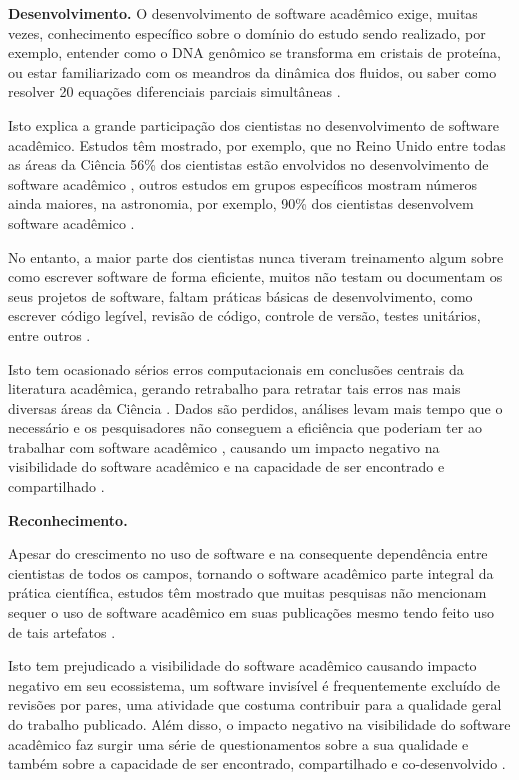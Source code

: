 \begin{description}
\item \textbf{Desenvolvimento.}
O desenvolvimento de software acadêmico exige, muitas vezes, conhecimento
específico sobre o domínio do estudo sendo realizado,
por exemplo, entender como o DNA genômico
se transforma em cristais de proteína, ou estar familiarizado com os meandros
da dinâmica dos fluidos, ou saber como resolver 20 equações diferenciais
parciais simultâneas \cite{segal2008developing}.

Isto explica a grande participação dos cientistas no desenvolvimento de
software acadêmico. Estudos têm mostrado, por exemplo, que no Reino Unido entre todas as
áreas da Ciência 56\% dos cientistas estão envolvidos no desenvolvimento de
software acadêmico \cite{hettrick2014uk}, outros estudos em grupos específicos mostram números ainda
maiores, na astronomia, por exemplo, 90\% dos cientistas desenvolvem software
acadêmico \cite{momcheva2015software}.

No entanto, a maior parte dos cientistas nunca tiveram treinamento algum sobre como escrever
software de forma eficiente, muitos não testam ou documentam os seus projetos de
software, faltam práticas básicas de desenvolvimento, como escrever código
legível, revisão de código, controle de versão, testes unitários, entre outros
\cite{wilson2017good}.

Isto tem ocasionado sérios erros computacionais em conclusões centrais da
literatura acadêmica, gerando retrabalho para retratar tais erros nas mais
diversas áreas da Ciência \cite{merali2010computational}.
Dados são perdidos, análises levam mais tempo que o necessário e os
pesquisadores não conseguem a eficiência que poderiam ter ao trabalhar com
software acadêmico \cite{wilson2017good},
causando um impacto negativo na visibilidade do software acadêmico e na
capacidade de ser encontrado e compartilhado \cite{howison2013incentives,
katz2014transitive}.

\item \textbf{Reconhecimento.}

Apesar do crescimento no uso de software e na consequente dependência entre
cientistas de todos os campos, tornando o software acadêmico parte integral da
prática científica, estudos têm
mostrado que muitas pesquisas não mencionam sequer o uso de software acadêmico
em suas publicações mesmo tendo feito uso de tais artefatos
\cite{momcheva2015software, howison2016software}.

Isto tem prejudicado a visibilidade do software acadêmico causando impacto
negativo em seu ecossistema, um software invisível é frequentemente excluído de
revisões por pares, uma atividade que costuma contribuir para a qualidade geral
do trabalho publicado. Além disso, o
impacto negativo na visibilidade do software acadêmico faz surgir uma
série de questionamentos sobre a sua qualidade e também sobre a
capacidade de ser encontrado, compartilhado e co-desenvolvido
\cite{howison2013incentives, katz2014transitive, howison2016software}.


\end{description}
